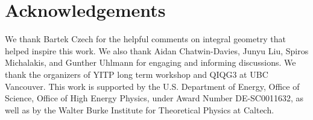 \documentclass[%
preprint,
nofootinbib,
amsmath,amssymb,
aps,
prd,
showpacs,
superscriptaddress
]{revtex4-1}
\begin{document}
\section*{Acknowledgements}
We thank Bartek Czech for the helpful comments on integral geometry that helped inspire this work. We also thank Aidan Chatwin-Davies, Junyu Liu, Spiros Michalakis, and Gunther Uhlmann for engaging and informing discussions. We thank the organizers of YITP long term workshop and QIQG3 at UBC Vancouver. This work is  supported by the U.S. Department of Energy, Office of Science, Office of High Energy Physics, under Award Number DE-SC0011632, as well as by the Walter Burke Institute for Theoretical Physics at Caltech.




\end{document}
